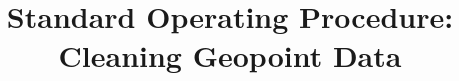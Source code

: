 \usepackage{hyperref}

\title{Standard Operating Procedure:\\Cleaning Geopoint Data}
\author{}
\date{}

\makeatletter
\renewcommand\maketitle{%
  \begin{center}
    {\LARGE \@title \par}
    \vskip 1em
    {\small Version 1.0 --- \today\par}
    \vskip 1.5em
    {\large T. Scott Murrell and Bernice Limo\par}
    {\small African Plant Nutrition Institute\par}
    {\small \href{mailto:s.murrell@apni.net}{s.murrell@apni.net} \\
           \href{mailto:b.limo@apni.net}{b.limo@apni.net}\par}
  \end{center}
}
\makeatother
